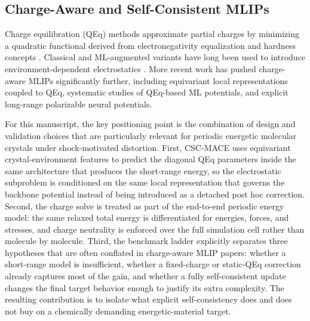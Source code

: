 \subsection{Charge-Aware and Self-Consistent MLIPs}
\label{sec:qeq_review}

Charge equilibration (QEq) methods approximate partial charges by minimizing a quadratic functional derived from electronegativity equalization and hardness concepts \cite{rappe1991charge}. Classical and ML-augmented variants have long been used to introduce environment-dependent electrostatics \cite{gastegger2017machine,unke2019physnet,ko2021fourth}. More recent work has pushed charge-aware MLIPs significantly further, including equivariant local representations coupled to QEq, systematic studies of QEq-based ML potentials, and explicit long-range polarizable neural potentials.

For this manuscript, the key positioning point is the combination of design and validation choices that are particularly relevant for periodic energetic molecular crystals under shock-motivated distortion. First, CSC-MACE uses equivariant crystal-environment features to predict the diagonal QEq parameters inside the same architecture that produces the short-range energy, so the electrostatic subproblem is conditioned on the same local representation that governs the backbone potential instead of being introduced as a detached post hoc correction. Second, the charge solve is treated as part of the end-to-end periodic energy model: the same relaxed total energy is differentiated for energies, forces, and stresses, and charge neutrality is enforced over the full simulation cell rather than molecule by molecule. Third, the benchmark ladder explicitly separates three hypotheses that are often conflated in charge-aware MLIP papers: whether a short-range model is insufficient, whether a fixed-charge or static-QEq correction already captures most of the gain, and whether a fully self-consistent update changes the final target behavior enough to justify its extra complexity. The resulting contribution is to isolate what explicit self-consistency does and does not buy on a chemically demanding energetic-material target.
